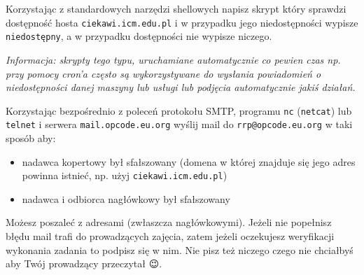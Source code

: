 % 
% 
% 
% 

\dbEntryCheckResults
Korzystając z standardowych narzędzi shellowych napisz skrypt który sprawdzi dostępność hosta \Verb#ciekawi.icm.edu.pl# i w przypadku jego niedostępności wypisze \Verb#niedostępny#, a w przypadku dostępności nie wypisze niczego.

\textit{Informacja: skrypty tego typu, uruchamiane automatycznie co pewien czas np. przy pomocy cron'a często są wykorzystywane do wysłania powiadomień o niedostępności danej maszyny lub usługi lub podjęcia automatycznie jakiś działań.}
\fi

\dbEntryCheckResults
Korzystając bezpośrednio z poleceń protokołu SMTP, programu \Verb#nc# (\Verb#netcat#) lub \Verb#telnet# i serwera \Verb#mail.opcode.eu.org# wyślij mail do \Verb#rrp@opcode.eu.org# w taki sposób aby:
\begin{itemize}
\item nadawca kopertowy był sfałszowany (domena w której znajduje się jego adres powinna istnieć, np. użyj \Verb#ciekawi.icm.edu.pl#)
\item nadawca i odbiorca nagłówkowy był sfałszowany
\end{itemize}
Możesz poszaleć z adresami (zwłaszcza nagłówkowymi).
Jeżeli nie popełnisz błędu mail trafi do prowadzących zajęcia, zatem jeżeli oczekujesz weryfikacji wykonania zadania to podpisz się w nim.
Nie pisz też niczego czego nie chciałbyś aby Twój prowadzący przeczytał {\Symbola 😉}.
\fi



